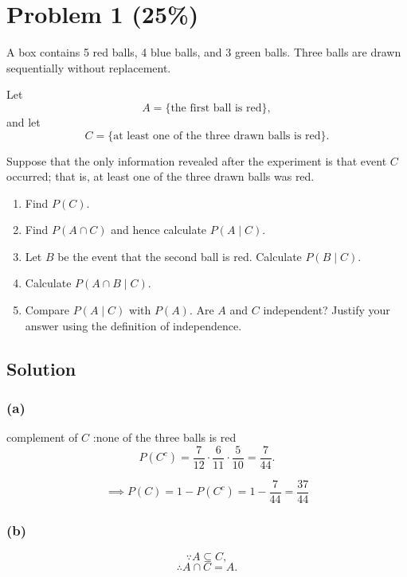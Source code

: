 \documentclass[12pt]{article}
\begin{document}
\section*{Problem 1 (25\%)}

A box contains 5 red balls, 4 blue balls, and 3 green balls.
Three balls are drawn sequentially without replacement.

Let
\[
A=\{\text{the first ball is red}\},
\]
and let
\[
C=\{\text{at least one of the three drawn balls is red}\}.
\]

Suppose that the only information revealed after the experiment is that
event $C$ occurred; that is, at least one of the three drawn balls was red.

\begin{enumerate}
    \item[(a)] Find $P(C)$.

    \item[(b)] Find $P(A\cap C)$ and hence calculate $P(A\mid C)$.

    \item[(c)] Let $B$ be the event that the second ball is red.
    Calculate $P(B\mid C)$.

    \item[(d)] Calculate $P(A\cap B\mid C)$.

    \item[(e)] Compare $P(A\mid C)$ with $P(A)$.
    Are $A$ and $C$ independent?
    Justify your answer using the definition of independence.
\end{enumerate}

\subsection*{Solution}

\subsubsection*{(a)}

complement of $C$ :none of the three balls is red
\[
P(C^c)
=
\frac{7}{12}\cdot\frac{6}{11}\cdot\frac{5}{10}
=
\frac{7}{44}.
\]

\[
\implies
P(C)
=
1-P(C^c)
=
1-\frac{7}{44}
=
\frac{37}{44}
\]

\subsubsection*{(b)}

\[
\because
A\subseteq C,
\]
\[
\therefore
A\cap C=A.
\]
\end{document}
